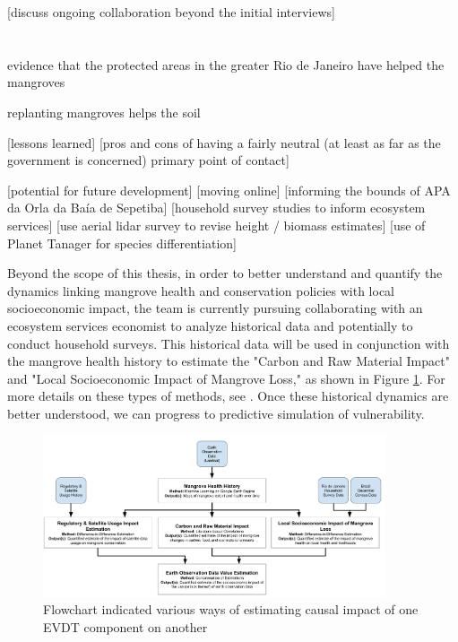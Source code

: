 [discuss ongoing collaboration beyond the initial interviews]


\section{} \label{sec:rio-discussion}


evidence that the protected areas in the greater Rio de Janeiro have helped the mangroves \cite{cavalcantiEvaluatingMangroveConservation2009}

replanting mangroves helps the soil \cite{jimenezRecoverySoilProcesses2022}

[lessons learned]
	[pros and cons of having a fairly neutral (at least as far as the government is concerned) primary point of contact]
	
[potential for future development]
	[moving online]
	[informing the bounds of APA da Orla da Baía de Sepetiba]
	[household survey studies to inform ecosystem services]
	[use aerial lidar survey to revise height / biomass estimates]
	[use of Planet Tanager for species differentiation]

Beyond the scope of this thesis, in order to better understand and quantify the dynamics linking mangrove health and conservation policies with local socioeconomic impact, the team is currently pursuing collaborating with an ecosystem services economist to analyze historical data and potentially to conduct household surveys. This historical data will be used in conjunction with the mangrove health history to estimate the "Carbon and Raw Material Impact" and "Local Socioeconomic Impact of Mangrove Loss," as shown in Figure \ref{fig:method}. For more details on these types of methods, see \cite{jungBrazilNationalEnvironmental2017, jungPartnershipsPreventDeforestation2018}. Once these historical dynamics are better understood, we can progress to predictive simulation of vulnerability.


\begin{figure}[t] 
\centering
\includegraphics[width=0.9\textwidth]{Figures/chap4/Method_Flowchart.png}
\caption{Flowchart indicated various ways of estimating causal impact of one EVDT component on another}
\label{fig:method}
\end{figure}

